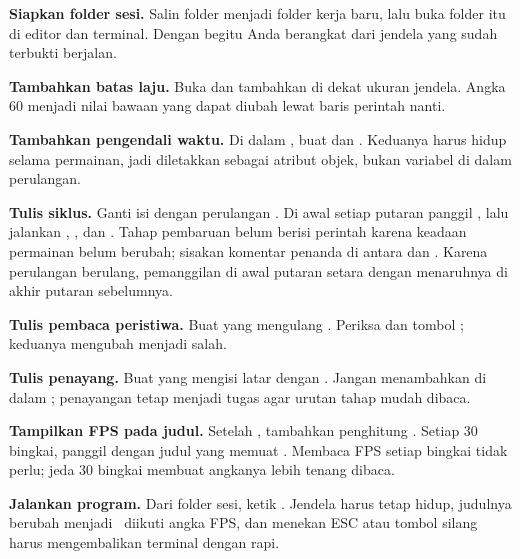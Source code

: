 \begin{langkah}
  \item \textbf{Siapkan folder sesi.} Salin folder  menjadi
        folder kerja baru, lalu buka folder itu di editor dan terminal. Dengan
        begitu Anda berangkat dari jendela yang sudah terbukti berjalan.

  \item \textbf{Tambahkan batas laju.} Buka 
        dan tambahkan  di dekat ukuran jendela. Angka 60 menjadi
        nilai bawaan yang dapat diubah lewat baris perintah nanti.

  \item \textbf{Tambahkan pengendali waktu.} Di dalam ,
        buat  dan
        . Keduanya harus hidup selama permainan, jadi
        diletakkan sebagai atribut objek, bukan variabel di dalam
        perulangan.

  \item \textbf{Tulis siklus.} Ganti isi  dengan perulangan
        . Di awal setiap putaran panggil
        , lalu jalankan
        , , dan
        . Tahap pembaruan belum berisi perintah
        karena keadaan permainan belum berubah; sisakan komentar penanda di
        antara  dan . Karena perulangan
        berulang, pemanggilan  di awal putaran setara dengan
        menaruhnya di akhir putaran sebelumnya.

  \item \textbf{Tulis pembaca peristiwa.} Buat  yang
        mengulang . Periksa
         dan tombol ; keduanya
        mengubah  menjadi salah.

  \item \textbf{Tulis penayang.} Buat  yang mengisi latar dengan
        . Jangan menambahkan
         di dalam ; penayangan tetap menjadi tugas
         agar urutan tahap mudah dibaca.

  \item \textbf{Tampilkan FPS pada judul.} Setelah , tambahkan
        penghitung . Setiap 30 bingkai, panggil
         dengan judul yang memuat
        . Membaca FPS setiap bingkai tidak
        perlu; jeda 30 bingkai membuat angkanya lebih tenang dibaca.

  \item \textbf{Jalankan program.} Dari folder sesi, ketik
        . Jendela harus tetap hidup, judulnya berubah
        menjadi \NamaPermainan\ diikuti angka FPS, dan menekan ESC atau tombol
        silang harus mengembalikan terminal dengan rapi.
\end{langkah}

